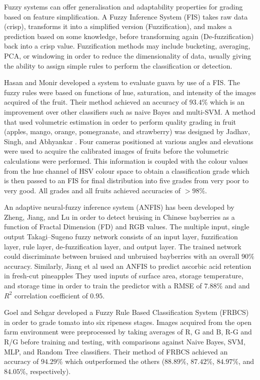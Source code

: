 \documentclass[fleqn,twoside,12pt]{report}
\begin{document}
Fuzzy systems can offer generalisation and adaptability properties for grading based on feature simplification. A Fuzzy Inference System (FIS) takes raw data (crisp), transforms it into a simplified version (Fuzzification), and makes a prediction based on some knowledge, before transforming again (De-fuzzification) back into a crisp value. Fuzzification methods may include bucketing, averaging, PCA, or windowing in order to reduce the dimensionality of data, usually giving the ability to assign simple rules to perform the classification or detection.

Hasan and Monir \cite{hasan} developed a system to evaluate guava by use of a FIS. The fuzzy rules were based on functions of hue, saturation, and intensity of the images acquired of the fruit. Their method achieved an accuracy of $93.4\%$ which is an improvement over other classifiers such as naive Bayes and multi-SVM. A method that used volumetric estimation in order to perform quality grading in fruit (apples, mango, orange, pomegranate, and strawberry) was designed by Jadhav, Singh, and Abhyankar \cite{jadhav}. Four cameras positioned at various angles and elevations were used to acquire the calibrated images of fruits before the volumetric calculations were performed. This information is coupled with the colour values from the hue channel of HSV colour space to obtain a classification grade which is then passed to an FIS for final distribution into five grades from very poor to very good. All grades and all fruits achieved accuracies of $>98\%$. 

An adaptive neural-fuzzy inference system (ANFIS) has been developed by Zheng, Jiang, and Lu \cite{zheng} in order to detect bruising in Chinese bayberries as a function of Fractal Dimension (FD) and RGB values. The multiple input, single output Takagi–Sugeno fuzzy network consists of an input layer, fuzzification layer, rule layer, de-fuzzification layer, and output layer. The trained network could discriminate between bruised and unbruised bayberries with an overall $90\%$ accuracy. Similarly, Jiang et al \cite{jiang} used an ANFIS to predict ascorbic acid retention in fresh-cut pineapples They used inputs of surface area, storage temperature, and storage time in order to train the predictor with a RMSE of $7.88\%$ and and $R^2$ correlation coefficient of $0.95$.

Goel and Sehgar \cite{goel} developed a Fuzzy Rule Based Classification System (FRBCS) in order to grade tomato into six ripeness stages. Images acquired from the open farm environment were preprocessed by taking averages of R, G and B, R-G and R/G before training and testing, with comparisons against Naive Bayes, SVM, MLP, and Random Tree classifiers. Their method of FRBCS achieved an accuracy of $94.29\%$ which outperformed the others ($88.89\%$, $87.42\%$, $84.97\%$, and $84.05\%$, respectively).  
\end{document}
